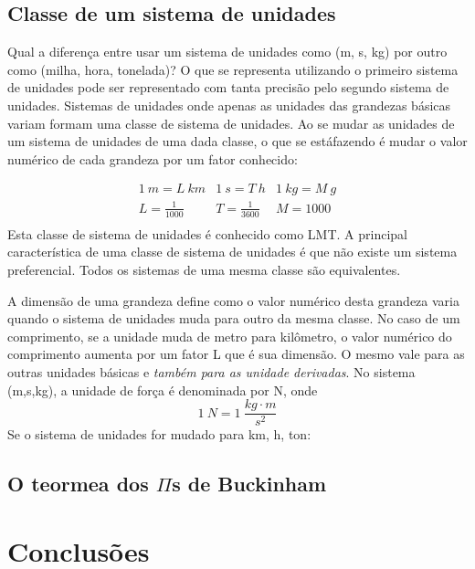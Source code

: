 \documentclass[article,12pt,oneside,a4paper,english,brazil,sumario=tradicional]{abntex2}
\begin{document}
\subsection{Classe de um sistema de unidades}

Qual a diferença entre usar um sistema de unidades como (m, s, kg) por outro como (milha, hora, tonelada)? O que se representa utilizando o primeiro sistema de unidades pode ser representado com tanta precisão pelo segundo sistema de unidades. Sistemas de unidades onde apenas as unidades das grandezas básicas variam formam uma classe de sistema de unidades. Ao se mudar as unidades de um sistema de unidades de uma dada classe, o que se estáfazendo é mudar o valor numérico de cada grandeza por um fator conhecido:

\[
\begin{matrix}
  1\:m = L\:km & 1\:s = T\:h & 1\:kg = M\:g\\
  L=\frac{1}{1000} & T = \frac{1}{3600} & M = 1000\\
\end{matrix}
\]
Esta classe de sistema de unidades é conhecido como LMT. A principal característica de uma classe de sistema de unidades é que não existe um sistema preferencial. Todos os sistemas de uma mesma classe são equivalentes.

A dimensão de uma grandeza define como o valor numérico desta grandeza varia quando o sistema de unidades muda para outro da mesma classe. No caso de um comprimento, se a unidade muda de metro para kilômetro, o valor numérico do comprimento aumenta por um fator L que é sua dimensão. O mesmo vale para as outras unidades básicas e \emph{também para as unidade derivadas}. No sistema (m,s,kg), a unidade de força é denominada por N, onde
\[
1\:N = 1\:\frac{kg\cdot m}{s^2}
\]
Se o sistema de unidades for mudado para km, h, ton: 


\subsection{O teormea dos $\Pi$s de Buckinham}

\section{Conclusões}





\end{document}
